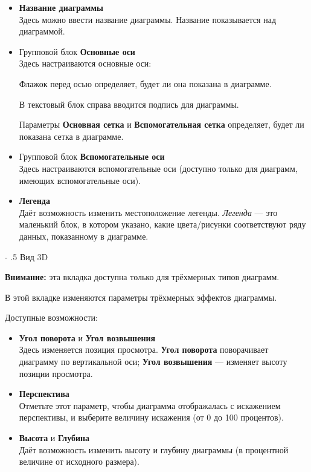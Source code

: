 \documentclass[a4paper,10pt]{article}
\makeatletter
\renewcommand\paragraph{%
   \@startsection{paragraph}{4}{0mm}%
      {-\baselineskip}%
      {.5\baselineskip}%
      {\normalfont\normalsize\bfseries}}
\makeatother
\begin{document}
 \begin{itemize}
  \item \textbf{Название диаграммы}\\
  Здесь можно ввести название диаграммы. Название показывается над диаграммой.
  \item Групповой блок \textbf{Основные оси}\\
  Здесь настраиваются основные оси:
  
  Флажок перед осью определяет, будет ли она показана в диаграмме.
  
  В текстовый блок справа вводится подпись для диаграммы.
  
  Параметры \textbf{Основная сетка} и \textbf{Вспомогательная сетка} определяет, будет ли показана сетка в диаграмме.
  \item Групповой блок \textbf{Вспомогательные оси}\\
  Здесь настраиваются вспомогательные оси (доступно только для диаграмм, имеющих вспомогательные оси).
  \item \textbf{Легенда}\\
Даёт возможность изменить местоположение легенды. \textit{Легенда} --- это маленький блок, в котором указано, какие цвета/рисунки соответствуют ряду данных, показанному в диаграмме.  
 \end{itemize}
 
 \paragraph{Вид 3D}
 \begin{mdframed}[backgroundcolor=blue!10]
\textbf{Внимание:} эта вкладка доступна только для трёхмерных типов диаграмм.
\end{mdframed}

В этой вкладке изменяются параметры трёхмерных эффектов диаграммы.

Доступные возможности:

\begin{itemize}
 \item \textbf{Угол поворота} и \textbf{Угол возвышения}\\
 Здесь изменяется позиция просмотра. \textbf{Угол поворота} поворачивает диаграмму по вертикальной оси; \textbf{Угол возвышения} --- изменяет высоту позиции просмотра.
 \item \textbf{Перспектива}\\
 Отметьте этот параметр, чтобы диаграмма отображалась с искажением перспективы, и выберите величину искажения (от 0 до 100 процентов).
 \item \textbf{Высота} и \textbf{Глубина}\\
 Даёт возможность изменить высоту и глубину диаграммы (в процентной величине от исходного размера).
\end{itemize}
\end{document}
